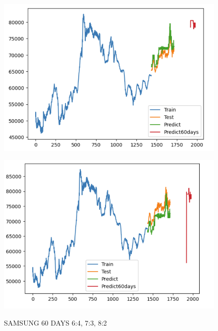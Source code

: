 \documentclass{article}
\begin{document}
\begin{multicols}{2}
\begin{figure}[H]
\begin{minipage}{0.15\textwidth}
    \label{fig:1}
    \end{minipage}%
    \begin{minipage}{0.15\textwidth}
    \centering
    \includegraphics[width=1\textwidth]{Image/Light GBM/SS_7_3_60.png}
  
    \label{fig:2}
    \end{minipage}%
    \begin{minipage}{0.15\textwidth}
    \centering
    \includegraphics[width=1\textwidth]{Image/Light GBM/SS_8_2_60.png}

    \label{fig:3}
    \end{minipage}
    \caption{SAMSUNG 60 DAYS  6:4, 7:3, 8:2 }
\end{figure}


\end{multicols}
\end{document}
